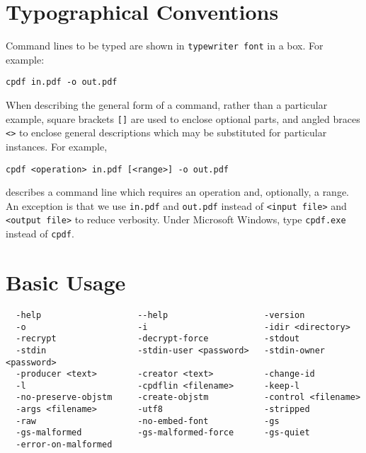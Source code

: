 \documentclass{book}
\begin{document}
\pagestyle{plain}
\tableofcontents\clearpage\pagestyle{empty}

\cleardoublepage
\pagestyle{plain}
\chapter*{Typographical Conventions}
Command lines to be typed are shown in \texttt{typewriter\hspace{-1mm} font} in a box.
For example:
\begin{framed}
\small\verb!cpdf in.pdf -o out.pdf!
\end{framed}
\noindent When describing the general form of a command, rather than a particular
example, square brackets \verb|[]| are used to enclose optional parts, and
angled braces \verb!<>! to enclose general descriptions which may be
substituted for particular instances. For example,
\begin{framed}
\small\verb!cpdf <operation> in.pdf [<range>] -o out.pdf!
\end{framed}
\noindent describes a command line which requires an operation and, optionally,
a range. An exception is that we use \texttt{in.pdf} and \texttt{out.pdf}
instead of \texttt{<input file>} and \texttt{<output file>} to reduce
verbosity. Under Microsoft Windows, type \texttt{cpdf.exe} instead of \texttt{cpdf}.
\clearpage\pagestyle{empty}\cleardoublepage
\mainmatter
\pagestyle{fancy}



\chapter{Basic Usage}\label{chap:1}


\label{basicusage}
  \begin{framed}
  \small
  \noindent\begin{verbatim}
  -help                   --help                   -version 
  -o                      -i                       -idir <directory>
  -recrypt                -decrypt-force           -stdout
  -stdin                  -stdin-user <password>   -stdin-owner <password>  
  -producer <text>        -creator <text>          -change-id
  -l                      -cpdflin <filename>      -keep-l
  -no-preserve-objstm     -create-objstm           -control <filename>
  -args <filename>        -utf8                    -stripped
  -raw                    -no-embed-font           -gs
  -gs-malformed           -gs-malformed-force      -gs-quiet
  -error-on-malformed\end{verbatim}\end{framed}
\end{document}
